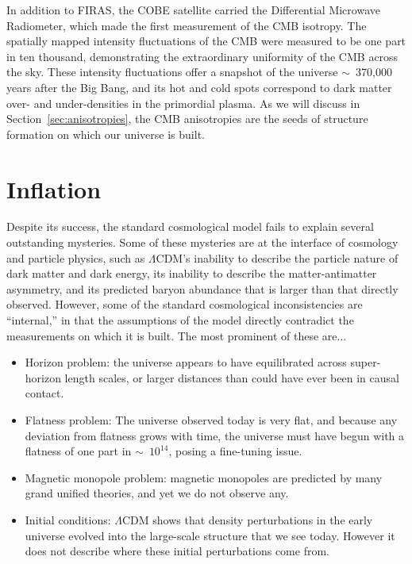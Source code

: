 In addition to FIRAS, the COBE satellite carried the Differential Microwave Radiometer, which made the first measurement of the CMB isotropy. The spatially mapped intensity fluctuations of the CMB were measured to be one part in ten thousand, demonstrating the extraordinary uniformity of the CMB across the sky. These intensity fluctuations offer a snapshot of the universe $\sim$~370,000 years after the Big Bang, and its hot and cold spots correspond to dark matter over- and under-densities in the primordial plasma. As we will discuss in Section~\ref{sec:anisotropies}, the CMB anisotropies are the seeds of structure formation on which our universe is built.


\section{Inflation}
\label{sec:inflation}

Despite its success, the standard cosmological model fails to explain several outstanding mysteries. Some of these mysteries are at the interface of cosmology and particle physics,  such as $\Lambda$CDM's inability to describe the particle nature of dark matter and dark energy, its inability to describe the matter-antimatter asymmetry, and its predicted baryon abundance that is larger than that directly observed. However, some of the standard cosmological inconsistencies are ``internal,'' in that the assumptions of the model directly contradict the measurements on which it is built. The most prominent of these are...

\begin{itemize}
    \item Horizon problem: the universe appears to have equilibrated across super-horizon length scales, or larger distances than could have ever been in causal contact.
    \item Flatness problem: The universe observed today is very flat, and because any deviation from flatness grows with time, the universe must have begun with a flatness of one part in $\sim$~$10^{14}$, posing a fine-tuning issue.
    \item Magnetic monopole problem: magnetic monopoles are predicted by many grand unified theories, and yet we do not observe any.
    \item Initial conditions: $\Lambda$CDM shows that density perturbations in the early universe evolved into the large-scale structure that we see today. However it does not describe where these initial perturbations come from.
\end{itemize}

